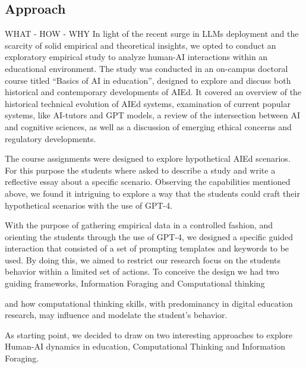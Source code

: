 \documentclass[sn-mathphys, Numbered]{sn-jnl}%
\theoremstyle{thmstyleone}%
\theoremstyle{thmstyletwo}%
\theoremstyle{thmstylethree}%
\begin{document}
\subsection{Approach}\label{Approach}  WHAT - HOW - WHY
In light of the recent surge in LLMs deployment and the scarcity of solid empirical and theoretical insights, we opted to conduct an exploratory empirical study to analyze human-AI interactions within an educational environment.
The study was conducted in an on-campus doctoral course titled “Basics of AI in education”, designed to explore and discuss both historical and contemporary developments of AIEd. It covered an overview of the historical technical evolution of AIEd systems, examination of current popular systems, like AI-tutors and GPT models, a review of the intersection between AI and cognitive sciences, as well as a discussion of emerging ethical concerns and regulatory developments. 

The course assignments were designed to explore hypothetical AIEd scenarios. For this purpose the students where asked to describe a study and write a reflective essay about a specific scenario. Observing the capabilities mentioned above, we found it intriguing to explore a way that the students could craft their hypothetical scenarios with the use of GPT-4. 

With the purpose of gathering empirical data in a controlled fashion, and orienting the students through the use of GPT-4, we designed a specific guided interaction that consisted of a set of prompting templates and keywords to be used. By doing this, we aimed to restrict our research focus on the students behavior within a limited set of actions. To conceive the design we had two guiding frameworks, Information Foraging and Computational thinking


and how computational thinking skills, with predominancy in digital education research, may influence and modelate the student's behavior.




As starting point, we decided to draw on two interesting approaches to explore Human-AI dynamics in education, Computational Thinking and Information Foraging. 



\end{document}
